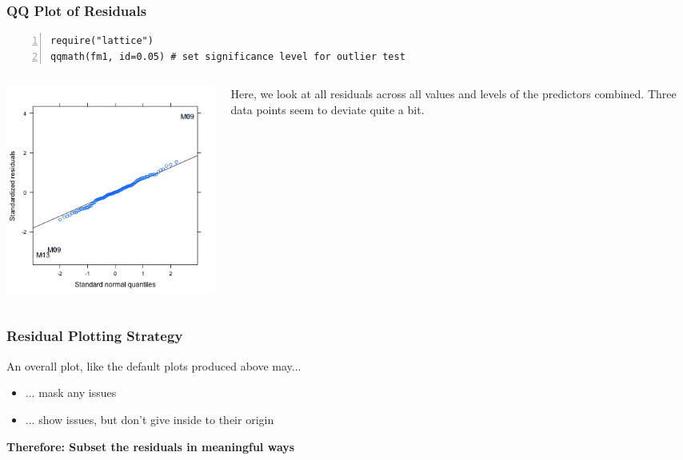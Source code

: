 \documentclass{beamer}
\begin{document}
\begin{frame}[fragile]
    \frametitle{QQ Plot of Residuals}
    \scriptsize\begin{Verbatim}[numbers=left,numbersep=6pt,frame=single]
require("lattice")
qqmath(fm1, id=0.05) # set significance level for outlier test        
    \end{Verbatim}
    \begin{columns}
        \begin{column}{0.5\textwidth}
            \includegraphics[width=\textwidth]{lectures/day_7_diagnostics_of_mems/figures/unnamed-chunk-26-1.png}  
        \end{column}
        \begin{column}{0.5\textwidth}
        \normalsize
            Here, we look at all residuals across all values and levels of the predictors combined. Three data points seem to deviate quite a bit.
        \end{column}
    \end{columns}
\end{frame}

\begin{frame}
    \frametitle{Residual Plotting Strategy}
    \large
    An overall plot, like the default plots produced above may...
    \vspace{0.2cm}
    
    \begin{itemize}
        \item ... mask any issues
        \item ... show issues, but don't give inside to their origin
    \end{itemize}
    \vspace{0.5cm}
    
    \textbf{Therefore: Subset the residuals in meaningful ways}
\end{frame}
\end{document}
